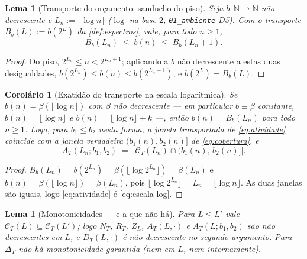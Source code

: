 \documentclass[11pt,a4paper]{article}
\newtheorem{lemma}[theorem]{Lema}
\newtheorem{corollary}[theorem]{Corolário}
\theoremstyle{definition}
\theoremstyle{remark}
\newcommand{\N}{\mathbb{N}}
\begin{document}
\begin{lemma}[Transporte do orçamento: sanducho do piso]\label{lem:transporte}
Seja $b : \N \to \N$ não decrescente e $L_n := \lfloor \log n \rfloor$
($\log$ na base $2$, \texttt{01\_ambiente} D5). Com o transporte
$B_b(L) := b(2^L)$ da \cref{def:espectros}, vale, para todo $n \geq 1$,
\begin{equation}\label{eq:transporte}
  B_b(L_n) \;\leq\; b(n) \;\leq\; B_b(L_n + 1).
\end{equation}
\end{lemma}

\begin{proof}
Do piso, $2^{L_n} \leq n < 2^{L_n+1}$; aplicando a $b$ não decrescente
a estas duas desigualdades, $b(2^{L_n}) \leq b(n) \leq b(2^{L_n+1})$, e
$b(2^{L}) = B_b(L)$.
\end{proof}

\begin{corollary}[Exatidão do transporte na escala logarítmica]\label{cor:escala-log}
Se $b(n) = \beta(\lfloor \log n \rfloor)$ com $\beta$ não decrescente
--- em particular $b \equiv \beta$ constante,
$b(n) = \lfloor \log n \rfloor$ e $b(n) = \lfloor \log n \rfloor + k$
---, então $b(n) = B_b(L_n)$ para todo $n \geq 1$. Logo, para $b_1
\leq b_2$ nesta forma, a janela transportada de \eqref{eq:atividade}
coincide com a janela verdadeira $(b_1(n), b_2(n)]$ de
\eqref{eq:cobertura}, e
\begin{equation}\label{eq:escala-log}
  A_T(L_n; b_1, b_2)
  \;=\; \bigl|\mathcal{C}_T(L_n) \cap (b_1(n),\, b_2(n)]\bigr| .
\end{equation}
\end{corollary}

\begin{proof}
$B_b(L_n) = b(2^{L_n}) = \beta(\lfloor \log 2^{L_n} \rfloor)
= \beta(L_n)$ e $b(n) = \beta(\lfloor \log n \rfloor) = \beta(L_n)$,
pois $\lfloor \log 2^{L_n} \rfloor = L_n = \lfloor \log n \rfloor$.
As duas janelas são iguais, logo \eqref{eq:atividade} é
\eqref{eq:escala-log}.
\end{proof}

\begin{lemma}[Monotonicidades --- e a que não há]\label{lem:lattice}
Para $L \leq L'$ vale $\mathcal{C}_T(L) \subseteq \mathcal{C}_T(L')$;
logo $N_T$, $R_T$, $Z_L$, $A_T(L,\cdot)$ e $A_T(L;b_1,b_2)$ são não
decrescentes em $L$, e $D_T(L,\cdot)$ é não decrescente no segundo
argumento. Para $\Delta_T$ \emph{não} há monotonicidade garantida (nem
em $L$, nem internamente).
\end{lemma}
\end{document}
